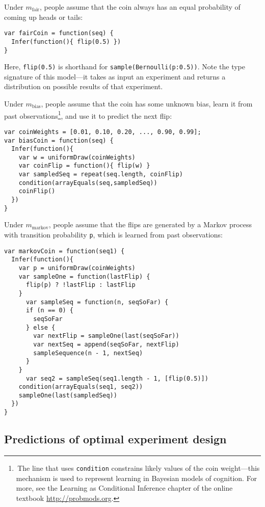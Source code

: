 \documentclass[10pt,letterpaper]{article}
\begin{document}
Under $m_{\text{fair}}$, people assume that the coin always has an equal probability of coming up heads or tails:
\begin{lstlisting}[upquote=true]
var fairCoin = function(seq) {
  Infer(function(){ flip(0.5) })
}
\end{lstlisting}
Here, \texttt{flip(0.5)} is shorthand for \texttt{sample(Bernoulli({p:0.5}))}.
Note the type signature of this model---it takes as input an experiment and returns a distribution on possible results of that experiment.

Under $m_{\text{bias}}$, people assume that the coin has some unknown bias, learn it from past observations\footnote{\,The line that uses \texttt{condition} constrains likely values of the coin weight---this mechanism is used to represent learning in Bayesian models of cognition. For more, see the Learning as Conditional Inference chapter of the online textbook \url{http://probmods.org}.}, and use it to predict the next flip:
\begin{lstlisting}[upquote=true]
var coinWeights = [0.01, 0.10, 0.20, ..., 0.90, 0.99];
var biasCoin = function(seq) {
  Infer(function(){
    var w = uniformDraw(coinWeights)
    var coinFlip = function(){ flip(w) }
    var sampledSeq = repeat(seq.length, coinFlip)
    condition(arrayEquals(seq,sampledSeq))
    coinFlip()
  })
}
\end{lstlisting}
Under $m_{\text{markov}}$, people assume that the flips are generated by a Markov process with transition probability \texttt{p}, which is learned from past observations:

\begin{lstlisting}
var markovCoin = function(seq1) {
  Infer(function(){
    var p = uniformDraw(coinWeights)
    var sampleOne = function(lastFlip) {
      flip(p) ? !lastFlip : lastFlip
    }
	  var sampleSeq = function(n, seqSoFar) {
      if (n == 0) {
        seqSoFar
      } else {
        var nextFlip = sampleOne(last(seqSoFar))
        var nextSeq = append(seqSoFar, nextFlip)
        sampleSequence(n - 1, nextSeq)
      }
    }
	  var seq2 = sampleSeq(seq1.length - 1, [flip(0.5)])
    condition(arrayEquals(seq1, seq2))
    sampleOne(last(sampledSeq))
  })
}
\end{lstlisting}

\subsection{Predictions of optimal experiment design}
\end{document}
